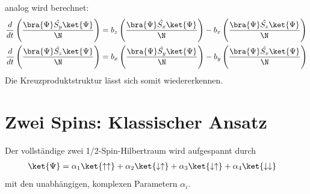 analog wird berechnet:
\begin{align}
    \frac{d}{dt}\left(\frac{\bra{\Psi}\hat{S_y}\ket{\Psi}}{\N}\right) &= b_z\left(\frac{\bra{\Psi}\hat{S_x}\ket{\Psi}}{\N}\right) - b_x\left(\frac{\bra{\Psi}\hat{S_z}\ket{\Psi}}{\N}\right)\\
    \frac{d}{dt}\left(\frac{\bra{\Psi}\hat{S_z}\ket{\Psi}}{\N}\right) &= b_x\left(\frac{\bra{\Psi}\hat{S_y}\ket{\Psi}}{\N}\right) - b_y\left(\frac{\bra{\Psi}\hat{S_x}\ket{\Psi}}{\N}\right)
\end{align}
Die Kreuzproduktstruktur lässt sich somit wiedererkennen.





















\section{Zwei Spins: Klassischer Ansatz}
Der vollständige zwei 1/2-Spin-Hilbertraum wird aufgespannt durch
\begin{align}
    \ket{\Psi} &= \alpha_1\ket{\uparrow\uparrow} + \alpha_2 \ket{\downarrow\uparrow} + \alpha_3\ket{\downarrow\uparrow} + \alpha_4\ket{\downarrow\downarrow}
\end{align}
mit den unabhängigen, komplexen Parametern $\alpha_i$.

